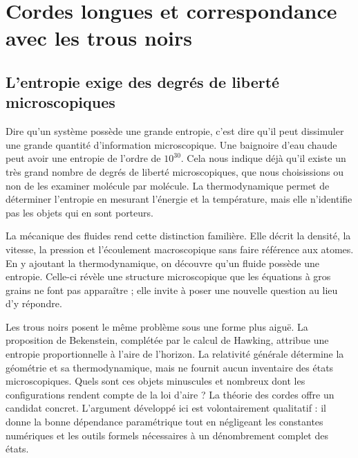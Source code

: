 \chapter{Cordes longues et correspondance avec les trous noirs}


\section{L’entropie exige des degrés de liberté microscopiques}

Dire qu’un système possède une grande entropie, c’est dire qu’il peut dissimuler une grande quantité d’information microscopique. Une baignoire d’eau chaude peut avoir une entropie de l’ordre de \(10^{30}\). Cela nous indique déjà qu’il existe un très grand nombre de degrés de liberté microscopiques, que nous choisissions ou non de les examiner molécule par molécule. La thermodynamique permet de déterminer l’entropie en mesurant l’énergie et la température, mais elle n’identifie pas les objets qui en sont porteurs.

La mécanique des fluides rend cette distinction familière. Elle décrit la densité, la vitesse, la pression et l’écoulement macroscopique sans faire référence aux atomes. En y ajoutant la thermodynamique, on découvre qu’un fluide possède une entropie. Celle-ci révèle une structure microscopique que les équations à gros grains ne font pas apparaître ; elle invite à poser une nouvelle question au lieu d’y répondre.

Les trous noirs posent le même problème sous une forme plus aiguë. La proposition de Bekenstein, complétée par le calcul de Hawking, attribue une entropie proportionnelle à l’aire de l’horizon. La relativité générale détermine la géométrie et sa thermodynamique, mais ne fournit aucun inventaire des états microscopiques. Quels sont ces objets minuscules et nombreux dont les configurations rendent compte de la loi d’aire ? La théorie des cordes offre un candidat concret. L’argument développé ici est volontairement qualitatif : il donne la bonne dépendance paramétrique tout en négligeant les constantes numériques et les outils formels nécessaires à un dénombrement complet des états.

